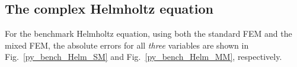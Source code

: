 \documentclass[review,3p]{elsarticle}
\begin{document}
% 


\newpage
\subsection{The complex Helmholtz equation}             \label{discretization_error_bench_Helm}

For the benchmark Helmholtz equation, using both the standard FEM and the mixed FEM, the absolute errors for all \emph{three} variables are shown in Fig.~\ref{py_bench_Helm_SM} and  Fig.~\ref{py_bench_Helm_MM}, respectively. 
\end{document}
